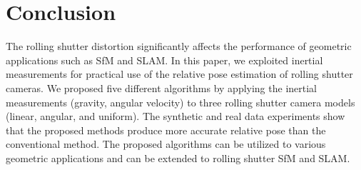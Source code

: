 \documentclass[10pt,twocolumn,letterpaper]{article}
\theoremstyle{definition}
\begin{document}
	\section{Conclusion}
	
	
	The rolling shutter distortion significantly affects the performance of geometric applications such as SfM and SLAM.
	In this paper, we exploited inertial measurements for practical use of the relative pose estimation of rolling shutter cameras.
	We proposed five different algorithms by applying the inertial measurements (gravity, angular velocity) to three rolling shutter camera models (linear, angular, and uniform).
	The synthetic and real data experiments show that the proposed methods produce more accurate relative pose than the conventional method.
	The proposed algorithms can be utilized to various geometric applications and can be extended to rolling shutter SfM and SLAM.
	
	{\small
		
		
	}
	
	
\end{document}

